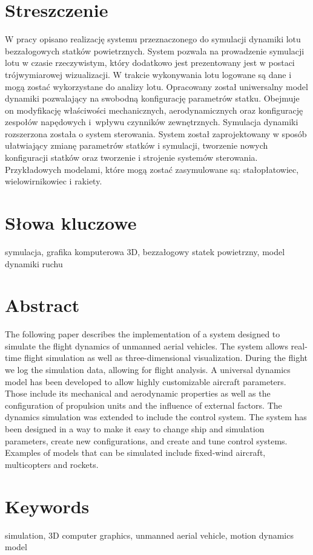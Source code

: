 \section*{Streszczenie}
W pracy opisano realizację systemu przeznaczonego do symulacji dynamiki lotu bezzałogowych statków powietrznych. System pozwala na prowadzenie symulacji lotu w czasie rzeczywistym, który dodatkowo jest prezentowany jest w postaci trójwymiarowej wizualizacji. W trakcie wykonywania lotu logowane są dane i mogą zostać wykorzystane do analizy lotu. Opracowany został uniwersalny model dynamiki pozwalający na swobodną konfigurację parametrów statku. Obejmuje on modyfikację właściwości mechanicznych, aerodynamicznych oraz konfigurację zespołów napędowych i~wpływu czynników zewnętrznych. Symulacja dynamiki rozszerzona została o system sterowania. System został zaprojektowany w sposób ułatwiający zmianę parametrów statków i symulacji, tworzenie nowych konfiguracji statków oraz tworzenie i strojenie systemów sterowania. Przykładowych modelami, które mogą zostać zasymulowane są: stałopłatowiec, wielowirnikowiec i rakiety.

\section*{Słowa kluczowe}

symulacja, grafika komputerowa 3D, bezzałogowy statek powietrzny, model dynamiki ruchu

\newpage

\section*{Abstract}

The following paper describes the implementation of a system designed to simulate the flight dynamics of unmanned aerial vehicles. The system allows real-time flight simulation as well as three-dimensional visualization. During the flight we log the simulation data, allowing for flight analysis. A universal dynamics model has been developed to allow highly customizable aircraft parameters. Those include its mechanical and aerodynamic properties as well as the configuration of propulsion units and the influence of external factors. The dynamics simulation was extended to include the control system. The system has been designed in a way to make it easy to change ship and simulation parameters, create new configurations, and create and tune control systems. Examples of models that can be simulated include fixed-wind aircraft, multicopters and rockets.

\section*{Keywords}

simulation, 3D computer graphics, unmanned aerial vehicle, motion dynamics model

\newpage
\tableofcontents